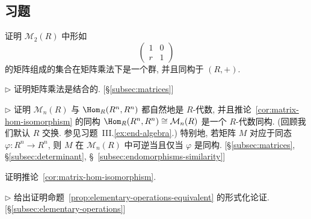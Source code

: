 \subsection*{习题}
{}

\begin{prob}
\label{ex:matrix-group-upper-tri}
证明 $\mathcal{M}_2(R)$ 中形如
\[
\begin{pmatrix} 1 & 0\\ r & 1\end{pmatrix}
\]
的矩阵组成的集合在矩阵乘法下是一个群, 并且同构于 $(R,+)$.
\end{prob}

\begin{prob}
\label{ex:matrix-mult-associative}
$\triangleright$ 证明矩阵乘法是结合的. [§\ref{subsec:matrices}]
\end{prob}

\begin{prob}
\label{ex:matrix-R-algebra}
$\triangleright$ 证明 $\mathcal{M}_n(R)$ 与 $\Hom_R(R^n,R^n)$ 都自然地是 $R$-代数, 并且推论~\ref{cor:matrix-hom-isomorphism} 的同构 $\Hom_R(R^n,R^n)\cong\mathcal{M}_n(R)$ 是一个 $R$-代数同构. (回顾我们默认 $R$ 交换. 参见习题~III.\ref{ex:end-algebra}.) 特别地, 若矩阵 $M$ 对应于同态 $\varphi:R^n\to R^n$, 则 $M$ 在 $\mathcal{M}_n(R)$ 中可逆当且仅当 $\varphi$ 是同构. [§\ref{subsec:matrices}, §\ref{subsec:determinant}, §~\ref{subsec:endomorphisms-similarity}]
\end{prob}

\begin{prob}
\label{ex:prove-cor-2-2}
证明推论~\ref{cor:matrix-hom-isomorphism}.
\end{prob}

\begin{prob}
\label{ex:prove-prop-2-7}
$\triangleright$ 给出证明命题~\ref{prop:elementary-operations-equivalent} 的形式化论证. [§\ref{subsec:elementary-operations}]
\end{prob}

